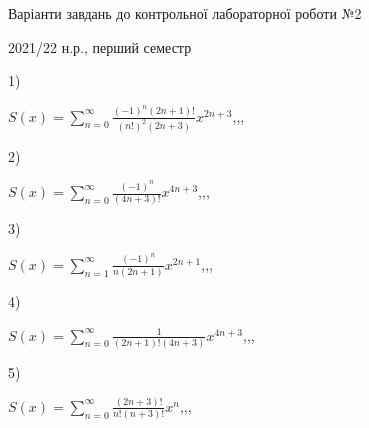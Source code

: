 \documentclass[11pt, ukrainian]{article}
\begin{document}
{\Large \center  Варіанти завдань до контрольної лабораторної роботи №2\par 2021/22 н.р., перший семестр\par \bigskip\bigskip}
1) \space 
{%
{$S(x)=\sum\limits_{n=0}^{\infty}{\frac{{(-1)^n}(2n+1)!}{{(n!)^2}(2n+3)}}{x^{{2n+3}}}$},,, \par \smallskip  
}
\par
\vspace{0.9cm}
2) \space 
{%
{$S(x)=\sum\limits_{n=0}^{\infty}{\frac{(-1)^n}{(4n+3)!}}{x^{{4n+3}}}$},,, \par \smallskip  
}
\par
\vspace{0.9cm}
3) \space 
{%
{$S(x)=\sum\limits_{n=1}^{\infty}{\frac{(-1)^n}{n(2n+1)}}{x^{{2n+1}}}$},,, \par \smallskip  
}
\par
\vspace{0.9cm}
4) \space 
{%
{$S(x)=\sum\limits_{n=0}^{\infty}{\frac{1}{(2n+1)!(4n+3)}}{x^{{4n+3}}}$},,, \par \smallskip  
}
\par
\vspace{0.9cm}
5) \space 
{%
{$S(x)=\sum\limits_{n=0}^{\infty}{\frac{(2n+3)!}{n!(n+3)!}}{x^{n}}$},,, \par \smallskip  
}
\par
\vspace{0.9cm}
\end{document}
